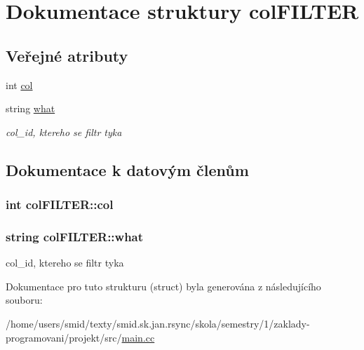 \hypertarget{structcolFILTER}{
\section{\-Dokumentace struktury col\-F\-I\-L\-T\-E\-R}
\label{d5/d5b/structcolFILTER}
}
\subsection*{\-Veřejné atributy}
\begin{DoxyCompactItemize}
\item 
int \hyperlink{structcolFILTER_a539cbb1248df088b6f70b8dc9dd5ddba}{col}
\item 
string \hyperlink{structcolFILTER_af47755579df5d6043ae582ff622cfb08}{what}
\begin{DoxyCompactList}\small\item\em col\-\_\-id, ktereho se filtr tyka \end{DoxyCompactList}\end{DoxyCompactItemize}


\subsection{\-Dokumentace k datovým členům}
\hypertarget{structcolFILTER_a539cbb1248df088b6f70b8dc9dd5ddba}{
\subsubsection[{col}]{\setlength{\rightskip}{0pt plus 5cm}int {\bf col\-F\-I\-L\-T\-E\-R\-::col}}}
\label{d5/d5b/structcolFILTER_a539cbb1248df088b6f70b8dc9dd5ddba}
\hypertarget{structcolFILTER_af47755579df5d6043ae582ff622cfb08}{
\subsubsection[{what}]{\setlength{\rightskip}{0pt plus 5cm}string {\bf col\-F\-I\-L\-T\-E\-R\-::what}}}
\label{d5/d5b/structcolFILTER_af47755579df5d6043ae582ff622cfb08}


col\-\_\-id, ktereho se filtr tyka 



\-Dokumentace pro tuto strukturu (struct) byla generována z následujícího souboru\-:\begin{DoxyCompactItemize}
\item 
/home/users/smid/texty/smid.\-sk.\-jan.\-rsync/skola/semestry/1/zaklady-\/programovani/projekt/src/\hyperlink{main_8cc}{main.\-cc}\end{DoxyCompactItemize}
